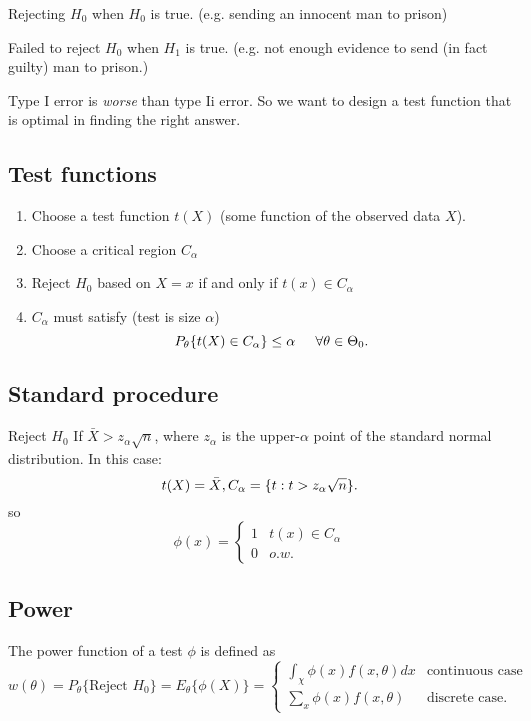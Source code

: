 \documentclass[12pt]{report} \addtolength{\textheight}{2in}
\begin{document}
\begin{description}
\item[Type I error:] Rejecting $H_0$ when $H_0$ is true. (e.g. sending an innocent man to prison)
\item[Type II error:] Failed to reject $H_0$ when $H_1$ is true. (e.g. not enough evidence to send (in fact guilty) man to prison.)
\item Type I error is \textit{worse} than type Ii error. So we want to design a test function that is optimal in finding the right answer.
\subsection*{Test functions}
\begin{enumerate}
\item Choose a test function $t(X)$ (some function of the observed data $X$).
\item Choose a critical region $C_{\alpha}$
\item Reject $H_0$ based on $X=x$ if and only if $t(x) \in C_{\alpha}$
\item $C_{\alpha}$ must satisfy (test is size $\alpha$)
\begin{displaymath}
P_{\theta}\{t(X) \in C_{\alpha} \} \leq \alpha \hspace{.2in} \forall \theta \in \Theta_{0}.
\end{displaymath}
\end{enumerate}
\newpage
\subsection*{Standard procedure } 
Reject $H_{0}$ If $\bar{X} > z_{\alpha} \sqrt{n}$, where $z_{\alpha}$ is the upper-$\alpha$ point of the standard normal distribution. In this case:
\begin{displaymath}
t(X)=\bar{X}, \vspace{.1in} C_{\alpha}=\{t: t > z_{\alpha}\sqrt{n}\}.
\end{displaymath}
so 
\begin{displaymath}
\phi(x)=
\begin{cases}
1 & t(x)\in C_{\alpha}\\
0& o.w.
\end{cases}
\end{displaymath}
\subsection*{Power}
The power function of a test $\phi$ is defined as 
\begin{displaymath}
w(\theta)=P_{\theta}\{\text{Reject  } H_{0}\}=E_{\theta} \{\phi(X)\} =
\begin{cases}
\int_{\chi} \phi(x)f(x,\theta) dx & \text{continuous case}\\
\sum_{x} \phi(x)f(x,\theta) & \text{discrete case}.
\end{cases}
\end{displaymath}


\end{description}
\end{document}
